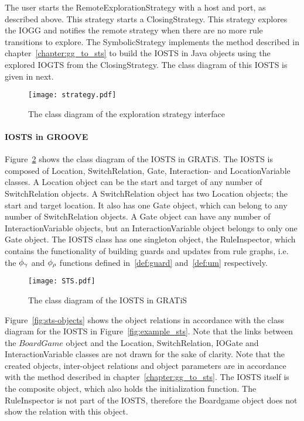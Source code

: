 The user starts the RemoteExplorationStrategy with a host and port, as described above. This strategy starts a ClosingStrategy. This strategy explores the IOGG and notifies the remote strategy when there are no more rule transitions to explore. The SymbolicStrategy implements  the method described in chapter~\ref{chapter:gg_to_sts} to build the IOSTS in Java objects using the explored IOGTS from the ClosingStrategy. The class diagram of this IOSTS is given in next.
 
\begin{figure}[ht]
  \begin{center}
    \texttt{[image: strategy.pdf]}
  \end{center}
  \caption{The class diagram of the exploration strategy interface}
  \label{fig:esi-diagram}
\end{figure}

\paragraph*{IOSTS in GROOVE}
Figure~\ref{fig:sts-diagram} shows the class diagram of the IOSTS in GRATiS. The IOSTS is composed of Location, SwitchRelation, Gate, Interaction- and LocationVariable classes. A Location object can be the start and target of any number of SwitchRelation objects. A SwitchRelation object has two Location objects; the start and target location. It also has one Gate object, which can belong to any number of SwitchRelation objects. A Gate object can have any number of InteractionVariable objects, but an InteractionVariable object belongs to only one Gate object. The IOSTS class has one singleton object, the RuleInspector, which contains the functionality of building guards and updates from rule graphs, i.e. the $\phi_{\gamma}$ and $\phi_{\rho}$ functions defined in~\ref{def:guard} and~\ref{def:um} respectively.

\begin{figure}[ht]
  \begin{center}
    \texttt{[image: STS.pdf]}
  \end{center}
  \caption{The class diagram of the IOSTS in GRATiS}
  \label{fig:sts-diagram}
\end{figure}

Figure~\ref{fig:sts-objects} shows the object relations in accordance with the class diagram for the IOSTS in Figure~\ref{fig:example_sts}. Note that the links between the $\mathit{BoardGame}$ object and the Location, SwitchRelation, IOGate and InteractionVariable classes are not drawn for the sake of clarity. Note that the created objects, inter-object relations and object parameters are in accordance with the method described in chapter~\ref{chapter:gg_to_sts}. The IOSTS itself is the composite object, which also holds the initialization function. The RuleInspector is not part of the IOSTS, therefore the Boardgame object does not show the relation with this object.

